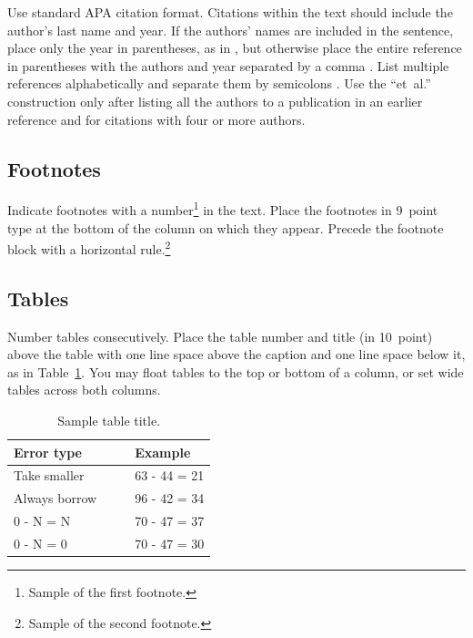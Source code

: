 \documentclass[10pt,letterpaper]{article}
\begin{document}
Use standard APA citation format. Citations within the text should
include the author's last name and year. If the authors' names are
included in the sentence, place only the year in parentheses, as in
, but otherwise place the entire reference in
parentheses with the authors and year separated by a comma
\cite{NewellSimon1972a}. List multiple references alphabetically and
separate them by semicolons
\cite{ChalnickBillman1988a,NewellSimon1972a}. Use the
``et~al.'' construction only after listing all the authors to a
publication in an earlier reference and for citations with four or
more authors.


\subsection{Footnotes}

Indicate footnotes with a number\footnote{Sample of the first
footnote.} in the text. Place the footnotes in 9~point type at the
bottom of the column on which they appear. Precede the footnote block
with a horizontal rule.\footnote{Sample of the second footnote.}


\subsection{Tables}

Number tables consecutively. Place the table number and title (in
10~point) above the table with one line space above the caption and
one line space below it, as in Table~\ref{sample-table}. You may float
tables to the top or bottom of a column, or set wide tables across
both columns.

\begin{table}[!ht]
\begin{center} 
\caption{Sample table title.} 
\label{sample-table} 
\vskip 0.12in
\begin{tabular}{ll} 
\hline
Error type    &  Example \\
\hline
Take smaller        &   63 - 44 = 21 \\
Always borrow~~~~   &   96 - 42 = 34 \\
0 - N = N           &   70 - 47 = 37 \\
0 - N = 0           &   70 - 47 = 30 \\
\hline
\end{tabular} 
\end{center} 
\end{table}
\end{document}
